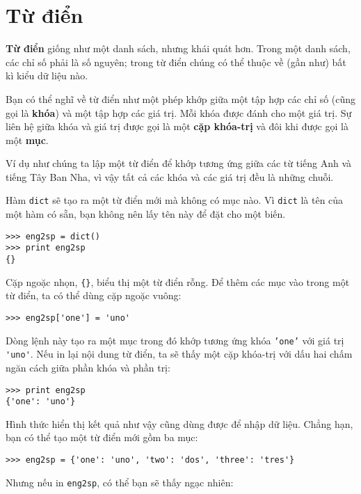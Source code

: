 \documentclass[11pt]{book}
\begin{document}
\chapter{Từ điển}


{\bf Từ điển} giống như một danh sách, nhưng khái quát hơn. Trong
một danh sách, các chỉ số phải là số nguyên; trong từ điển chúng 
có thể thuộc về (gần như) bất kì kiểu dữ liệu nào.

Bạn có thể nghĩ về từ điển như một phép khớp giữa một tập hợp các
chỉ số (cũng gọi là {\bf khóa}) và một tập hợp các giá trị.
Mỗi khóa được đánh cho một giá trị. Sự liên hệ giữa khóa và 
giá trị được gọi là một {\bf cặp khóa-trị} và đôi khi được gọi là
một {\bf mục}.

Ví dụ như chúng ta lập một từ điển để khớp tương ứng giữa các từ
tiếng Anh và tiếng Tây Ban Nha, vì vậy tất cả các khóa và các
giá trị đều là những chuỗi.

Hàm {\tt dict} sẽ tạo ra một từ điển mới mà không có mục nào.
Vì {\tt dict} là tên của một hàm có sẵn, bạn không nên lấy tên này
để đặt cho một biến.


\beforeverb
\begin{verbatim}
>>> eng2sp = dict()
>>> print eng2sp
{}
\end{verbatim}
\afterverb

Cặp ngoặc nhọn, \verb"{}", biểu thị một từ điển rỗng. Để thêm
các mục vào trong một từ điển, ta có thể dùng cặp ngoặc vuông:


\beforeverb
\begin{verbatim}
>>> eng2sp['one'] = 'uno'
\end{verbatim}
\afterverb
%
Dòng lệnh này tạo ra một mục trong đó khớp tương ứng khóa 
{\tt 'one'} với giá trị \verb"'uno'".  Nếu in lại nội dung
từ điển, ta sẽ thấy một cặp khóa-trị với dấu hai chấm ngăn cách
giữa phần khóa và phần trị:

\beforeverb
\begin{verbatim}
>>> print eng2sp
{'one': 'uno'}
\end{verbatim}
\afterverb
%
Hình thức hiển thị kết quả như vậy cũng dùng được để nhập
dữ liệu. Chẳng hạn, bạn có thể tạo một từ điển mới gồm ba mục:

\beforeverb
\begin{verbatim}
>>> eng2sp = {'one': 'uno', 'two': 'dos', 'three': 'tres'}
\end{verbatim}
\afterverb
%
Nhưng nếu in {\tt eng2sp}, có thể bạn sẽ thấy ngạc nhiên:
\end{document}
